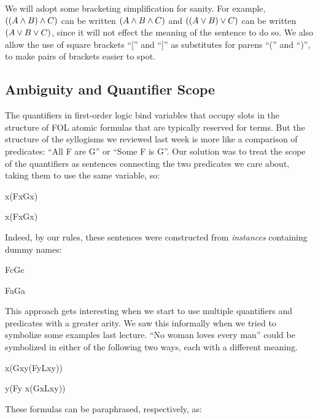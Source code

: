 We will adopt some bracketing simplification for sanity. For example,
$((A\wedge B)\wedge C)$ can be written $(A\wedge B\wedge C)$ and
$((A\vee B)\vee C)$ can be written $(A\vee B\vee C)$, since it will not
effect the meaning of the sentence to do so. We also allow the use of square
brackets ``['' and ``]'' as substitutes for parens ``('' and ``)'', to make
pairs of brackets easier to spot.

\subsection{Ambiguity and Quantifier Scope}

The quantifiers in first-order logic bind variables that occupy slots in the
structure of FOL atomic formulas that are typically reserved for terms. But
the structure of the syllogisms we reviewed last week is more like a comparison
of predicates: ``All F are G'' or ``Some F is G''. Our solution was to treat
the scope of the quantifiers as sentences connecting the two predicates we
care about, taking them to use the same variable, so:

\begin{argument}
  \item[ ] \eforall x(Fx\eif Gx)
  \item[ ] \eexists x(Fx\eand Gx)
\end{argument}

Indeed, by our rules, these sentences were constructed from \emph{instances}
containing dummy names:

\begin{argument}
  \item[ ] Fc\eif Gc
  \item[ ] Fa\eand Ga
\end{argument}

This approach gets interesting when we start to use multiple quantifiers and
predicates with a greater arity. We saw this informally when we tried to
symbolize some examples last lecture. ``No woman loves every man'' could be
symbolized in either of the following two ways, each with a different meaning.

\begin{argument}
\item[ ] \enot\eexists x(Gx\eand\eforall y(Fy\eif Lxy))
\item[ ] \eforall y(Fy \eif \enot\eexists x(Gx\eand Lxy))
\end{argument}

These formulas can be paraphrased, respectively, as:


